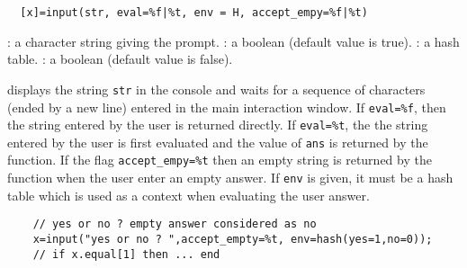 \begin{mandesc}
\end{mandesc}
\begin{calling_sequence}
\begin{verbatim}
  [x]=input(str, eval=%f|%t, env = H, accept_empy=%f|%t)     
\end{verbatim}
\end{calling_sequence}
\begin{parameters}
  \begin{varlist}
    : a character string giving the prompt.
    : a boolean (default value is true).
    : a hash table.
    : a boolean (default value is false).
  \end{varlist}
\end{parameters}
\begin{mandescription}
  displays the string \verb!str! in the console and waits for a sequence 
  of characters (ended by a new line) entered in the main interaction 
  window. If \verb!eval=%f!, then the string entered by the user is 
  returned directly. If \verb!eval=%t!, the the string entered by the 
  user is first evaluated and the value of \verb!ans! is returned by 
  the function. If the flag \verb!accept_empy=%t! then an empty string 
  is returned by the function when the user enter an empty answer. 
  If \verb!env! is given, it must be a hash table which is used as a 
  context when evaluating the user answer.
\end{mandescription}
\begin{examples}
  \begin{Verbatim}
    // yes or no ? empty answer considered as no 
    x=input("yes or no ? ",accept_empty=%t, env=hash(yes=1,no=0));
    // if x.equal[1] then ... end 
  \end{Verbatim}
\end{examples}

